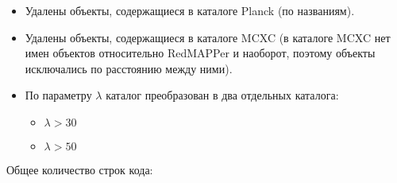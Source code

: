 \documentclass{article}
\begin{document}
\begin{enumerate}
\begin{itemize}
            \item Удалены объекты, содержащиеся в каталоге Planck (по названиям). \\
            \item Удалены объекты, содержащиеся в каталоге MCXC (в каталоге MCXC нет имен объектов 
                относительно RedMAPPer и наоборот, поэтому объекты исключались по расстоянию между ними). \\
            \item По параметру $\lambda$ каталог преобразован в два отдельных каталога: \\
                \begin{itemize}
                    \item $\lambda > 30 $\\
                    \item $\lambda > 50 $\\
                \end{itemize}
        \end{itemize}

\end{enumerate}

Общее количество строк кода: \\
\end{document}

